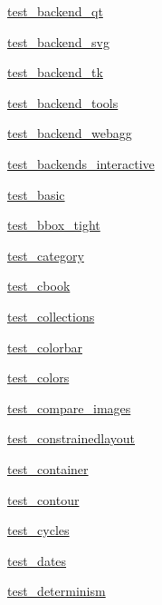 \begin{DoxyCompactItemize}
\item 
 \hyperlink{namespacematplotlib_1_1tests_1_1test__backend__qt}{test\+\_\+backend\+\_\+qt}
\item 
 \hyperlink{namespacematplotlib_1_1tests_1_1test__backend__svg}{test\+\_\+backend\+\_\+svg}
\item 
 \hyperlink{namespacematplotlib_1_1tests_1_1test__backend__tk}{test\+\_\+backend\+\_\+tk}
\item 
 \hyperlink{namespacematplotlib_1_1tests_1_1test__backend__tools}{test\+\_\+backend\+\_\+tools}
\item 
 \hyperlink{namespacematplotlib_1_1tests_1_1test__backend__webagg}{test\+\_\+backend\+\_\+webagg}
\item 
 \hyperlink{namespacematplotlib_1_1tests_1_1test__backends__interactive}{test\+\_\+backends\+\_\+interactive}
\item 
 \hyperlink{namespacematplotlib_1_1tests_1_1test__basic}{test\+\_\+basic}
\item 
 \hyperlink{namespacematplotlib_1_1tests_1_1test__bbox__tight}{test\+\_\+bbox\+\_\+tight}
\item 
 \hyperlink{namespacematplotlib_1_1tests_1_1test__category}{test\+\_\+category}
\item 
 \hyperlink{namespacematplotlib_1_1tests_1_1test__cbook}{test\+\_\+cbook}
\item 
 \hyperlink{namespacematplotlib_1_1tests_1_1test__collections}{test\+\_\+collections}
\item 
 \hyperlink{namespacematplotlib_1_1tests_1_1test__colorbar}{test\+\_\+colorbar}
\item 
 \hyperlink{namespacematplotlib_1_1tests_1_1test__colors}{test\+\_\+colors}
\item 
 \hyperlink{namespacematplotlib_1_1tests_1_1test__compare__images}{test\+\_\+compare\+\_\+images}
\item 
 \hyperlink{namespacematplotlib_1_1tests_1_1test__constrainedlayout}{test\+\_\+constrainedlayout}
\item 
 \hyperlink{namespacematplotlib_1_1tests_1_1test__container}{test\+\_\+container}
\item 
 \hyperlink{namespacematplotlib_1_1tests_1_1test__contour}{test\+\_\+contour}
\item 
 \hyperlink{namespacematplotlib_1_1tests_1_1test__cycles}{test\+\_\+cycles}
\item 
 \hyperlink{namespacematplotlib_1_1tests_1_1test__dates}{test\+\_\+dates}
\item 
 \hyperlink{namespacematplotlib_1_1tests_1_1test__determinism}{test\+\_\+determinism}

\end{DoxyCompactItemize}
